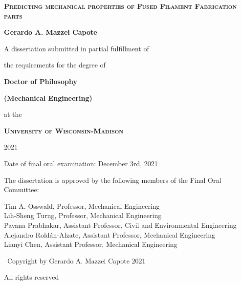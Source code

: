 \documentclass[main.tex]{subfiles}
\begin{document}
\begin{titlepage}
	\begin{center}
		\vspace{1cm}
		{\scshape\Huge\textbf{Predicting mechanical properties of Fused Filament Fabrication parts} \par}
		\vspace{1cm}
		{\LARGE\textbf{Gerardo A. Mazzei Capote} \par}
		\vspace{1cm}
		{\Large A dissertation submitted in partial fulfillment of \par 
				the requirements for the degree of \par}
		\vspace{1cm}
		{\LARGE\textbf{Doctor of Philosophy} \par}
		{\LARGE\textbf{(Mechanical Engineering)} \par}
		\vspace{1cm}
		{\Large at the \par}
		\vspace{0.5cm}
		{\scshape\LARGE\textbf{ University of Wisconsin-Madison} \par}
		\vspace{0.5cm}
		{\Large 2021 \par}
		\vfill
		{Date of final oral examination: December 3rd, 2021}		
	\end{center}

The dissertation is approved by the following members of the Final Oral Committee:

\setlength\parindent{36pt}
\indent Tim A. Osswald, Professor, Mechanical Engineering\\
\indent Lih-Sheng Turng, Professor, Mechanical Engineering\\
\indent Pavana Prabhakar, Assistant Professor, Civil and Environmental Engineering\\
\indent Alejandro Rold\'an-Alzate, Assistant Professor, Mechanical Engineering\\
\indent Lianyi Chen, Assistant Professor, Mechanical Engineering\\
\end{titlepage}
\pagebreak
\vspace*{\fill}
\begin{center}
	\textcopyright~Copyright by Gerardo A. Mazzei Capote 2021
	
	All rights reserved	
\end{center}

\pagestyle{empty}
\cleardoublepage
\end{document}
